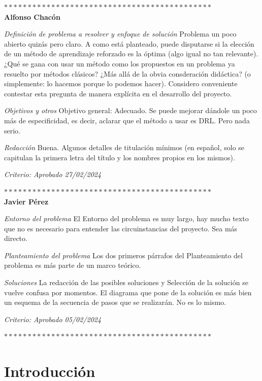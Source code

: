 
$********************************************$\\
\textbf{Alfonso Chacón} 

\textit{Definición de problema a resolver y enfoque de solución}
Problema un poco abierto quizás pero claro. 
A como está planteado, puede disputarse si la elección de un método de aprendizaje reforzado es la óptima (algo igual no tan relevante). ¿Qué se gana con usar un método como los propuestos en un problema ya resuelto por métodos clásicos? 
¿Más allá de la obvia consderación didáctica? (o simplemente: lo hacemos porque lo podemos hacer). Considero conveniente contestar esta pregunta de manera explícita en el desarrollo del proyecto.

\textit{Objetivos y otros}
Objetivo general: Adecuado. Se puede mejorar dándole un poco más de especificidad, es decir, aclarar que el método a usar es DRL. Pero nada serio.

\textit{Redacción}
Buena. Algunos detalles de titulación mínimos (en español, solo se capitulan la primera letra del título y los nombres propios en los mismos).

\textit{Criterio: Aprobado  27/02/2024}

$********************************************$\\
\textbf{Javier Pérez}

\textit{Entorno del problema}
El Entorno del problema es muy largo, hay mucho texto que no es necesario para entender las circuinstancias del proyecto. Sea más directo.

\textit{Planteamiento del problema}
Los dos primeros párrafos del Planteamiento del problema es más parte de un marco teórico.

\textit{Soluciones}
La redacción de las posibles soluciones y Selección de la solución se vuelve confusa por momentos.
El diagrama que pone de la solución es más bien un esquema de la secuencia de pasos que se realizarán. No es lo mismo.

\textit{Criterio: Aprobado  05/02/2024}

$********************************************$\\

\chapter{Introducción}
\label{chp:intro}

